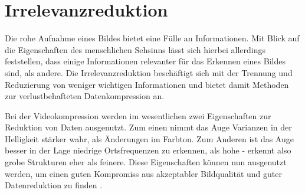 \chapter{Irrelevanzreduktion}
\label{kap:Irrelevanzreduktion}


Die rohe Aufnahme eines Bildes bietet eine Fülle an Informationen. Mit Blick auf die Eigenschaften des menschlichen Sehsinns lässt sich hierbei allerdings feststellen, dass einige Informationen relevanter für das Erkennen eines Bildes sind, als andere. Die Irrelevanzreduktion beschäftigt sich mit der Trennung und Reduzierung von weniger wichtigen Informationen und bietet damit Methoden zur verlustbehafteten Datenkompression an.

Bei der Videokompression werden im wesentlichen zwei Eigenschaften zur Reduktion von Daten ausgenutzt. Zum einen nimmt das Auge Varianzen in der Helligkeit stärker wahr, als Änderungen im Farbton. Zum Anderen ist das Auge besser in der Lage niedrige Ortsfrequenzen zu erkennen, als hohe - erkennt also grobe Strukturen eher als feinere. Diese Eigenschaften können nun ausgenutzt werden, um einen guten Kompromiss aus akzeptabler Bildqualität und guter Datenreduktion zu finden \cite{akramullah_digital_2014}.

